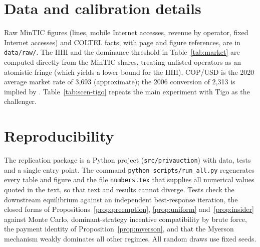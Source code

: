 \documentclass[12pt,a4paper]{article}
\theoremstyle{definition}
\theoremstyle{remark}
\begin{document}
\section{Data and calibration details}\label{app:data}

Raw MinTIC figures (lines, mobile Internet accesses, revenue by operator, fixed Internet accesses) and COLTEL facts, with page and figure references, are in \texttt{data/raw/}. The HHI and the dominance threshold in Table~\ref{tab:market} are computed directly from the MinTIC shares, treating unlisted operators as an atomistic fringe (which yields a lower bound for the HHI). COP/USD is the 2020 average market rate of 3,693 (approximate); the 2006 conversion of 2,313 is implied by \citet{infobae2006}. Table~\ref{tab:scen-tigo} repeats the main experiment with Tigo as the challenger.

\begin{table}[!htbp]
\centering\footnotesize
\caption{Counterfactual regimes with Tigo as the challenger (US\$ million)}\label{tab:scen-tigo}

\end{table}

\section{Reproducibility}\label{app:repro}

The replication package is a Python project (\texttt{src/privauction}) with data, tests and a single entry point. The command \texttt{python scripts/run\_all.py} regenerates every table and figure and the file \texttt{numbers.tex} that supplies all numerical values quoted in the text, so that text and results cannot diverge. Tests check the downstream equilibrium against an independent best-response iteration, the closed forms of Propositions~\ref{prop:preemption}, \ref{prop:uniform} and~\ref{prop:insider} against Monte Carlo, dominant-strategy incentive compatibility by brute force, the payment identity of Proposition~\ref{prop:myerson}, and that the Myerson mechanism weakly dominates all other regimes. All random draws use fixed seeds.



\end{document}
